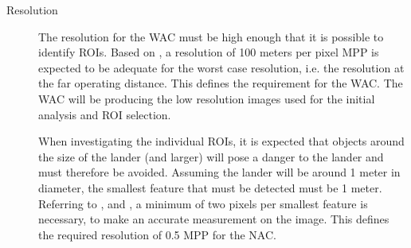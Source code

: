 \begin{description}
\item[Resolution]
The resolution for the WAC must be high enough that it is possible to identify ROIs. Based on , a resolution of 100 meters per pixel MPP is expected to be adequate for the worst case resolution, i.e. the resolution at the far operating distance. This defines the requirement for the WAC. The WAC will be producing the low resolution images used for the initial analysis and ROI selection.

When investigating the individual ROIs, it is expected that objects around the size of the lander (and larger) will pose a danger to the lander and must therefore be avoided. Assuming the lander will be around 1 meter in diameter, the smallest feature that must be detected must be 1 meter. Referring to \cite{andor2016}, \cite{ni2014} and \cite{sbig2014}, a minimum of two pixels per smallest feature is necessary, to make an accurate measurement on the image. This defines the required resolution of 0.5 MPP for the NAC.


\end{description}
